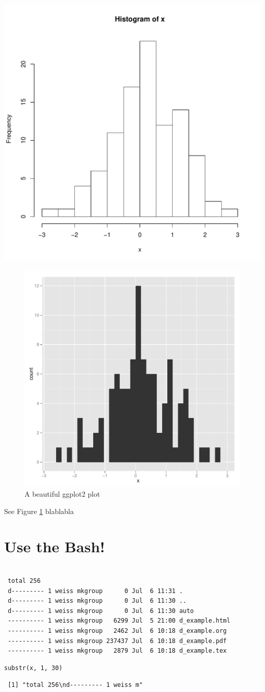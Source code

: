 \documentclass[11pt]{article}
\begin{document}
\includegraphics[width=.9\linewidth]{../fig/f_pub_histogram.pdf}





\begin{figure}[htb]
\centering
\includegraphics[width = 0.2\linewidth, clip]{../fig/f_pub_histogram_gg.pdf}
\caption{\label{f:ggplot}A beautiful ggplot2 plot}
\end{figure}

See Figure \ref{f:ggplot} blablabla
\section{Use the Bash!}
\label{sec-3}




\begin{verbatim}
 
 total 256
 d--------- 1 weiss mkgroup      0 Jul  6 11:31 .
 d--------- 1 weiss mkgroup      0 Jul  6 11:30 ..
 d--------- 1 weiss mkgroup      0 Jul  6 11:30 auto
 ---------- 1 weiss mkgroup   6299 Jul  5 21:00 d_example.html
 ---------- 1 weiss mkgroup   2462 Jul  6 10:18 d_example.org
 ---------- 1 weiss mkgroup 237437 Jul  6 10:18 d_example.pdf
 ---------- 1 weiss mkgroup   2879 Jul  6 10:18 d_example.tex
\end{verbatim}



\lstset{language=R}
\begin{lstlisting}
substr(x, 1, 30)
\end{lstlisting}

\begin{verbatim}
 [1] "total 256\nd--------- 1 weiss m"
\end{verbatim}
\end{document}
